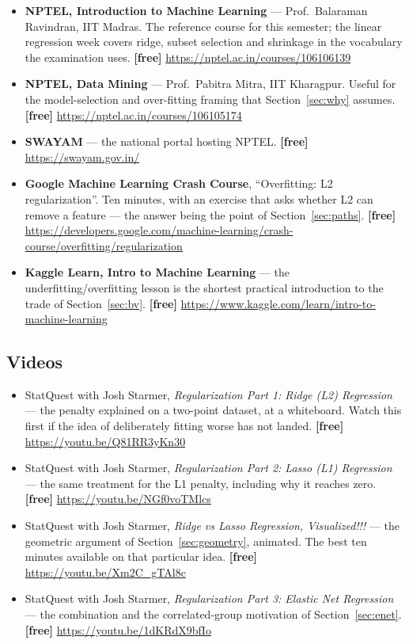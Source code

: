 \documentclass[11pt]{article}
\begin{document}
\begin{sloppypar}
\begin{itemize}[leftmargin=*]
  \item \textbf{NPTEL, Introduction to Machine Learning} --- Prof.\ Balaraman
    Ravindran, IIT Madras. The reference course for this semester; the linear
    regression week covers ridge, subset selection and shrinkage in the
    vocabulary the examination uses. \textbf{[free]}
    \url{https://nptel.ac.in/courses/106106139}
  \item \textbf{NPTEL, Data Mining} --- Prof.\ Pabitra Mitra, IIT Kharagpur.
    Useful for the model-selection and over-fitting framing that
    Section~\ref{sec:why} assumes. \textbf{[free]}
    \url{https://nptel.ac.in/courses/106105174}
  \item \textbf{SWAYAM} --- the national portal hosting NPTEL. \textbf{[free]}
    \url{https://swayam.gov.in/}
  \item \textbf{Google Machine Learning Crash Course}, ``Overfitting: L2
    regularization''. Ten minutes, with an exercise that asks whether L2 can
    remove a feature --- the answer being the point of
    Section~\ref{sec:paths}. \textbf{[free]}
    \url{https://developers.google.com/machine-learning/crash-course/overfitting/regularization}
  \item \textbf{Kaggle Learn, Intro to Machine Learning} --- the
    underfitting/overfitting lesson is the shortest practical introduction to
    the trade of Section~\ref{sec:bv}. \textbf{[free]}
    \url{https://www.kaggle.com/learn/intro-to-machine-learning}
\end{itemize}
\end{sloppypar}

\subsection*{Videos}

\begin{itemize}[leftmargin=*]
  \item StatQuest with Josh Starmer, \emph{Regularization Part 1: Ridge (L2)
    Regression} --- the penalty explained on a two-point dataset, at a
    whiteboard. Watch this first if the idea of deliberately fitting worse has
    not landed. \textbf{[free]} \url{https://youtu.be/Q81RR3yKn30}
  \item StatQuest with Josh Starmer, \emph{Regularization Part 2: Lasso (L1)
    Regression} --- the same treatment for the L1 penalty, including why it
    reaches zero. \textbf{[free]} \url{https://youtu.be/NGf0voTMlcs}
  \item StatQuest with Josh Starmer, \emph{Ridge vs Lasso Regression,
    Visualized!!!} --- the geometric argument of Section~\ref{sec:geometry},
    animated. The best ten minutes available on that particular idea.
    \textbf{[free]} \url{https://youtu.be/Xm2C_gTAl8c}
  \item StatQuest with Josh Starmer, \emph{Regularization Part 3: Elastic Net
    Regression} --- the combination and the correlated-group motivation of
    Section~\ref{sec:enet}. \textbf{[free]} \url{https://youtu.be/1dKRdX9bfIo}
\end{itemize}
\end{document}
